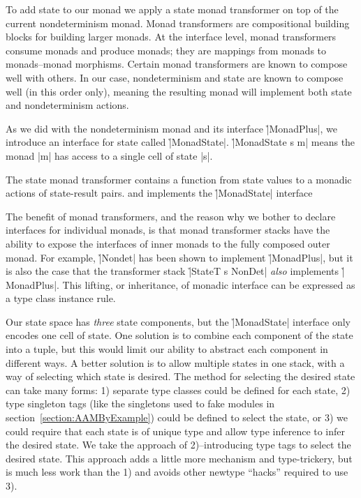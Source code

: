 To add state to our monad we apply a state monad transformer on top of the
current nondeterminism monad.
%
Monad transformers are compositional building blocks for building larger
monads.
%
At the interface level, monad transformers consume monads and produce monads;
they are mappings from monads to monads--monad morphisms.
%
Certain monad transformers are known to compose well with others.
%
In our case, nondeterminism and state are known to compose well (in this order
only), meaning the resulting monad will implement both state and nondeterminism
actions.


As we did with the nondeterminism monad and its interface \h|MonadPlus|, we
introduce an interface for state called \h|MonadState|.
%
\h|MonadState s m| means the monad \p|m| has access to a single cell of state
\p|s|.
%


The state monad transformer contains a function from state values to a monadic
actions of state-result pairs.
%
%
and implements the \h|MonadState| interface
%


The benefit of monad transformers, and the reason why we bother to declare
interfaces for individual monads, is that monad transformer stacks have the
ability to expose the interfaces of inner monads to the fully composed outer
monad.
%
For example, \h|Nondet| has been shown to implement \h|MonadPlus|, but it is
also the case that the transformer stack \h|StateT s NonDet| \textit{also}
implements \h|MonadPlus|.
%
This lifting, or inheritance, of monadic interface can be expressed as a type
class instance rule.
%


Our state space has \textit{three} state components, but the \h|MonadState|
interface only encodes one cell of state.
%
One solution is to combine each component of the state into a tuple, but this
would limit our ability to abstract each component in different ways.
%
A better solution is to allow multiple states in one stack, with a way of
selecting which state is desired.
%
The method for selecting the desired state can take many forms:
1) separate type classes could be defined for each state, 2) type singleton
tags (like the singletons used to fake modules in
section~\ref{section:AAMByExample}) could be defined to select the state, or 3)
we could require that each state is of unique type and allow type inference to
infer the desired state.
%
We take the approach of 2)--introducing type tags to select the desired state.
%
This approach adds a little more mechanism and type-trickery, but is much less
work than the 1) and avoids other newtype ``hacks'' required to use 3).

